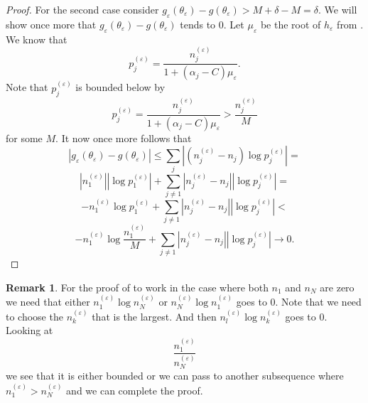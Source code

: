 \documentclass{article}
\theoremstyle{plain}
\theoremstyle{definition}
\newtheorem{remark}      {\bf Remark}      [section]
\begin{document}
\begin{proof}
	For the second case consider
	$g_\varepsilon(\theta_\varepsilon)-g(\theta_\varepsilon)>M+\delta-M=\delta$.
	We will show once more that $g_\varepsilon(\theta_\varepsilon)-
	g(\theta_\varepsilon)$ tends to $0$. Let $\mu_\varepsilon$ be the root of
	$h_\varepsilon$ from . We know that
	$$p^{(\varepsilon)}_j=\frac{n^{(\varepsilon)}_j}{1+(\alpha_j-C)\mu_\varepsilon}.$$
	Note that $p^{(\varepsilon)}_j$ is bounded below by
	$$p^{(\varepsilon)}_j=\frac{n^{(\varepsilon)}_j}{1+(\alpha_j-C)\mu_\varepsilon}
	>\frac{n^{(\varepsilon)}_j}M$$ for some $M$. It now once more follows that
	$$|g_\varepsilon(\theta_\varepsilon)-g(\theta_\varepsilon)|\leq
	\sum_j |(n^{(\varepsilon)}_j-n_j)\log p^{(\varepsilon)}_j|=$$$$
	|n^{(\varepsilon)}_1||\log p^{(\varepsilon)}_1|+
	\sum_{j\neq1} |n^{(\varepsilon)}_j-n_j||\log p^{(\varepsilon)}_j|=$$$$
	-n^{(\varepsilon)}_1\log p^{(\varepsilon)}_1+
	\sum_{j\neq1} |n^{(\varepsilon)}_j-n_j||\log p^{(\varepsilon)}_j|<$$$$
	-n^{(\varepsilon)}_1\log\frac{n^{(\varepsilon)}_1}{M}+
	\sum_{j\neq1} |n^{(\varepsilon)}_j-n_j||\log p^{(\varepsilon)}_j|\to0.$$
\end{proof}
\begin{remark}
	For the proof of  to work in the case where both
	$n_1$ and $n_N$ are zero we need that either $n^{(\varepsilon)}_1\log
	n^{(\varepsilon)}_N$ or $n^{(\varepsilon)}_N\log
	n^{(\varepsilon)}_1$ goes to $0$. Note that we need to choose the
	$n^{(\varepsilon)}_k$ that is the largest. And then $n^{(\varepsilon)}
	_l\log n^{(\varepsilon)}_k$ goes to $0$. Looking at $$\frac{n^{(\varepsilon)}_1}
	{n^{(\varepsilon)}_N}$$ we see that it is either bounded or we can pass
	to another subsequence where $n^{(\varepsilon)}_1>n^{(\varepsilon)}_N$
	and we can complete the proof.
\end{remark}



\end{document}
